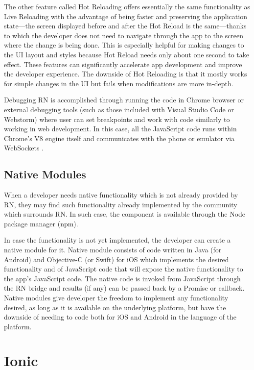 The other feature called Hot Reloading  offers essentially the same functionality as Live Reloading with the advantage of being faster and preserving the application state---the screen displayed before and after the Hot Reload is the same---thanks to which the developer does not need to navigate through the app to the screen where the change is being done. This is especially helpful for making changes to the UI layout and styles because Hot Reload needs only about one second to take effect. These features can significantly accelerate app development and improve the developer experience. The downside of Hot Reloading is that it mostly works for simple changes in the UI but fails when modifications are more in-depth.

Debugging RN is accomplished through running the code in Chrome browser or external debugging tools (such as those included with Visual Studio Code or Webstorm) where user can set breakpoints and work with code similarly to working in web development. In this case, all the JavaScript code runs within Chrome's V8 engine itself and communicates with the phone or emulator via WebSockets \cite{rn:debugging}.


\subsection{Native Modules}

When a developer needs native functionality which is not already provided by RN, they may find such functionality already implemented by the community which surrounds RN. In such case, the component is available through the Node package manager (npm).

In case the functionality is not yet implemented, the developer can create a native module  \cite{rn:nativemodules} for it. Native module consists of code written in Java (for Android) and Objective-C (or Swift) for iOS which implements the desired functionality and of JavaScript code that will expose the native functionality to the app's JavaScript code. The native code is invoked from JavaScript through the RN bridge and results (if any) can be passed back by a Promise or callback. Native modules give developer the freedom to implement any functionality desired, as long as it is available on the underlying platform, but have the downside of needing to code both for iOS and Android in the language of the platform.


\section{Ionic}

